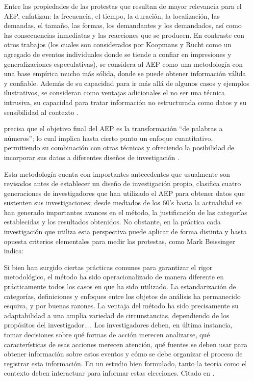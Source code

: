 \documentclass[letterpaper, 11pt]{book}
\theoremstyle{definition}
\theoremstyle{remark}
\begin{document}
Entre las propiedades de las protestas que resultan de mayor relevancia para el AEP, \citet{2002_Koopmans_AEP} enfatizan: la frecuencia, el tiempo, la duración, la localización, las demandas, el tamaño, las formas, los demandantes y los demandados, así como las consecuencias inmediatas y las reacciones que se producen. 
En contraste con otros trabajos (los cuales son considerados por Koopmans y Rucht como un agregado de eventos individuales donde se tiende a confiar en impresiones y generalizaciones especulativas), se considera al AEP como una metodología con una base empírica mucho más sólida, donde se puede obtener información válida y confiable. 
Además de su capacidad para ir más allá de algunos casos y ejemplos ilustrativos, se consideran como ventajas adicionales el no ser una técnica intrusiva, su capacidad para tratar información no estructurada como datos y su sensibilidad al contexto \citep[337]{2014_Hutter_AEP}.

\citet{2010_Franzosi_QNA} precisa que el objetivo final del AEP es la transformación ``de palabras a números''; lo cual implica hasta cierto punto un enfoque cuantitativo, permitiendo  su combinación con otras técnicas y ofreciendo la posibilidad de incorporar sus datos a diferentes diseños de investigación \citep[336]{2014_Hutter_AEP}. 

Esta metodología cuenta con importantes antecedentes que usualmente son revisados antes de establecer un diseño de investigación propio, \citet{2014_Hutter_AEP} clasifica cuatro generaciones de investigadores que han utilizado el AEP para obtener datos que sustenten sus investigaciones; desde mediados de los 60's hasta la actualidad se han generado importantes avances en el método, la justificación de las categorías establecidas y los resultados obtenidos. 
No obstante, en la práctica cada investigación que utiliza esta perspectiva puede aplicar de forma distinta y hasta opuesta criterios elementales para medir las protestas, como Mark Beissinger indica:

\begin{center}
    \begin{minipage}{0.9\linewidth}
        {\setlength{\parindent}{12pt}\small
        Si bien han surgido ciertas prácticas comunes para garantizar el rigor metodológico, el método ha sido operacionalizado de manera diferente en prácticamente todos los casos en que ha sido utilizado. 
        La estandarización de categorías, definiciones y enfoques entre los objetos de análisis ha permanecido esquiva, y por buenas razones. 
        La ventaja del método ha sido precisamente su adaptabilidad a una amplia variedad de circunstancias, dependiendo de los propósitos del investigador.... Los investigadores deben, en última instancia, tomar decisiones sobre qué formas de acción merecen analizarse, qué características de esas acciones merecen atención, qué fuentes se deben usar para obtener información sobre estos eventos y cómo se debe organizar el proceso de registrar esta información. 
        En un estudio bien formulado, tanto la teoría como el contexto deben interactuar para informar estas elecciones. \normalsize Citado en \citep[341]{2014_Hutter_AEP}.
        }
    \end{minipage}
\end{center}
\end{document}
